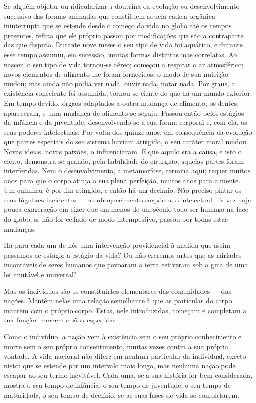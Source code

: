 \documentclass[11pt,a5paper,twoside,openany]{book}
\begin{document}
Se alguém objetar ou ridicularizar a doutrina da evolução ou desenvolvimento sucessivo das formas animadas que constituem aquela cadeia orgânica ininterrupta que se estende desde o começo da vida no globo até os tempos presentes, reflita que ele próprio passou por modificações que são a contraparte das que disputa. Durante nove meses o seu tipo de vida foi aquático, e durante esse tempo assumiu, em sucessão, muitas formas distintas mas correlatas. Ao nascer, o seu tipo de vida tornou-se aéreo; começou a respirar o ar atmosférico; novos elementos de alimento lhe foram fornecidos; o modo de sua nutrição mudou; mas ainda não podia ver nada, ouvir nada, notar nada. Por graus, a existência consciente foi assumida; tornou-se ciente de que há um mundo exterior. Em tempo devido, órgãos adaptados a outra mudança de alimento, os dentes, apareceram, e uma mudança de alimento se seguiu. Passou então pelos estágios da infância e da juventude, desenvolvendo-se a sua forma corporal e, com ela, os seus poderes intelectuais. Por volta dos quinze anos, em consequência da evolução que partes especiais do seu sistema haviam atingido, o seu caráter moral mudou. Novas ideias, novas paixões, o influenciaram. E que aquilo era a causa, e isto o efeito, demonstra-se quando, pela habilidade do cirurgião, aquelas partes foram interferidas. Nem o desenvolvimento, a metamorfose, termina aqui; requer muitos anos para que o corpo atinja a sua plena perfeição, muitos anos para a mente. Um culminar é por fim atingido, e então há um declínio. Não preciso pintar os seus lúgubres incidentes — o enfraquecimento corpóreo, o intelectual. Talvez haja pouca exageração em dizer que em menos de um século todo ser humano na face do globo, se não for ceifado de modo intempestivo, passou por todas estas mudanças.

Há para cada um de nós uma intervenção providencial à medida que assim passamos de estágio a estágio da vida? Ou não creremos antes que as miríades incontáveis de seres humanos que povoaram a terra estiveram sob a guia de uma lei imutável e universal?

Mas os indivíduos são os constituintes elementares das comunidades — das nações. Mantêm nelas uma relação semelhante à que as partículas do corpo mantêm com o próprio corpo. Estas, nele introduzidas, começam e completam a sua função; morrem e são despedidas.

Como o indivíduo, a nação vem à existência sem o seu próprio conhecimento e morre sem o seu próprio consentimento, muitas vezes contra a sua própria vontade. A vida nacional não difere em nenhum particular da individual, exceto nisto: que se estende por um intervalo mais longo, mas nenhuma nação pode escapar ao seu termo inevitável. Cada uma, se a sua história for bem considerada, mostra o seu tempo de infância, o seu tempo de juventude, o seu tempo de maturidade, o seu tempo de declínio, se as suas fases de vida se completarem.
\end{document}
